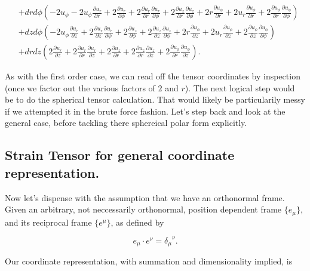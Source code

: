 \begin{equation}
\begin{aligned}
&+dr d\phi  \left(-2 u_{\phi }-2 u_{\phi } \frac{\partial u_r}{\partial r}+2 \frac{\partial u_r}{\partial \phi }+2 \frac{\partial u_r}{\partial r} \frac{\partial u_r}{\partial \phi }+2 \frac{\partial u_z}{\partial r} \frac{\partial u_z}{\partial \phi }+2 r \frac{\partial u_{\phi }}{\partial r}+2 u_r \frac{\partial u_{\phi }}{\partial r}+2 \frac{\partial u_{\phi }}{\partial r} \frac{\partial u_{\phi }}{\partial \phi }\right) \\
&+dz d\phi  \left(-2 u_{\phi } \frac{\partial u_r}{\partial z}+2 \frac{\partial u_r}{\partial z} \frac{\partial u_r}{\partial \phi }+2 \frac{\partial u_z}{\partial \phi }+2 \frac{\partial u_z}{\partial z} \frac{\partial u_z}{\partial \phi }+2 r \frac{\partial u_{\phi }}{\partial z}+2 u_r \frac{\partial u_{\phi }}{\partial z}+2 \frac{\partial u_{\phi }}{\partial z} \frac{\partial u_{\phi }}{\partial \phi }\right) \\
&+dr dz \left(2 \frac{\partial u_r}{\partial z}+2 \frac{\partial u_r}{\partial r} \frac{\partial u_r}{\partial z}+2 \frac{\partial u_z}{\partial r}+2 \frac{\partial u_z}{\partial r} \frac{\partial u_z}{\partial z}+2 \frac{\partial u_{\phi }}{\partial r} \frac{\partial u_{\phi }}{\partial z}\right).
\end{aligned}
\end{equation}

As with the first order case, we can read off the tensor coordinates by inspection (once we factor out the various factors of $2$ and $r$).  The next logical step would be to do the spherical tensor calculation.  That would likely be particularily messy if we attempted it in the brute force fashion.  Let's step back and look at the general case, before tackling there sphereical polar form explicitly.

\subsection{Strain Tensor for general coordinate representation.}

Now let's dispense with the assumption that we have an orthonormal frame.  Given an arbitrary, not neccessarily orthonormal, position dependent frame $\{e_\mu\}$, and its reciprocal frame $\{e^\mu\}$, as defined by

\begin{equation}\label{eqn:continuumL2:510}
e_\mu \cdot e^\nu = {\delta_\mu}^\nu.
\end{equation}

Our coordinate representation, with summation and dimensionality implied, is

